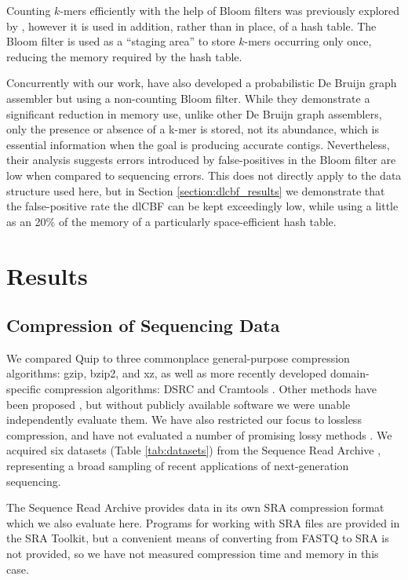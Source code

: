 \documentclass[twocolumn]{article}
\begin{document}
Counting $k$-mers efficiently with the help of Bloom filters was previously
explored by \citet{Melsted2011}, however it is used in addition, rather than
in place, of a hash table. The Bloom filter is used as a ``staging area'' to
store $k$-mers occurring only once, reducing the memory required by the hash
table. 

Concurrently with our work, \citet{Pell2011} have also developed a
probabilistic De Bruijn graph assembler but using a non-counting Bloom
filter. While they demonstrate a significant reduction in memory use, unlike
other De Bruijn graph assemblers, only the presence or absence of a k-mer is
stored, not its abundance, which is essential information when the goal is
producing accurate contigs. Nevertheless, their analysis suggests errors
introduced by false-positives in the Bloom filter are low when compared to
sequencing errors. This does not directly apply to the data structure used
here, but in Section \ref{section:dlcbf_results} we demonstrate that the
false-positive rate the dlCBF can be kept exceedingly low, while using a
little as an 20\% of the memory of a particularly space-efficient hash table.


\section{Results}
\label{section:results}

\subsection{Compression of Sequencing Data}


We compared Quip to three commonplace general-purpose compression algorithms:
gzip, bzip2, and xz, as well as more recently developed domain-specific
compression algorithms: DSRC \citep{Deorowicz2011} and Cramtools \citep{Hsi-
YangFritz2011}. Other methods have been proposed \citep{Tembe2010,
Kozanitis2011, Bhola2011, Sakib2011}, but without publicly available software
we were unable independently evaluate them. We have also restricted our focus
to lossless compression, and have not evaluated a number of promising lossy
methods \citep{Hsi-YangFritz2011,Wan2011,Hach2012}. We acquired six datasets
(Table \ref{tab:datasets}) from the Sequence Read Archive
\citep{Leinonen2011}, representing a broad sampling of recent applications of
next-generation sequencing.

The Sequence Read Archive provides data in its own SRA compression format
which we also evaluate here. Programs for working with SRA files are provided
in the SRA Toolkit, but a convenient means of converting from FASTQ to SRA is
not provided, so we have not measured compression time and memory in this
case.
\end{document}
